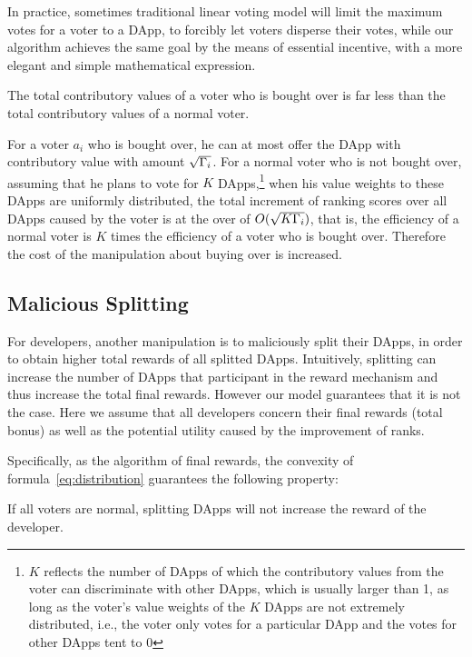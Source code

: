 In practice, sometimes traditional  linear voting model will limit the maximum votes for a voter to a DApp, to forcibly let voters disperse their votes, while our algorithm achieves the same goal by the means of essential incentive, with a more elegant and simple mathematical expression.


\begin{corollary}
	The total contributory values of a  voter who is bought over is far less than the total contributory values of a normal voter.
\end{corollary}
For a voter $a_i$ who is bought over, he can at most offer the DApp with contributory value with amount $\sqrt{\Gamma_i}$. For a normal voter who is not bought over, assuming that he plans to vote for $K$ DApps,\footnote{$K$ reflects the number of DApps of which the contributory values from the voter can discriminate with other DApps, which is usually larger than 1, as long as the voter's value weights of the $K$ DApps are not extremely distributed, i.e., the voter only votes for a particular DApp and the votes for other DApps tent to 0} when  his value weights to these DApps are uniformly distributed, the total increment of ranking scores  over all DApps caused by the voter is at the over of $O(\sqrt{K\Gamma_i})$, that is, the efficiency of a normal voter is $K$ times the efficiency of a voter who is bought over. Therefore the cost of the manipulation about buying over is increased.

\subsection{Malicious Splitting}
\label{subsec:5.2}
\noindent For developers, another manipulation is to maliciously split their DApps, in order to obtain higher total rewards of all splitted DApps. Intuitively, splitting can increase the number of DApps that participant in the reward mechanism and thus increase the total final rewards. However our model guarantees that it is not the case. Here we assume that all developers concern their final rewards (total bonus) as well as the potential utility caused by the improvement of ranks.

Specifically, as the algorithm of final rewards, the convexity of formula~\ref{eq:distribution} guarantees the following property:
\begin{property}
	\label{p2}
    If all voters are normal, splitting DApps will not increase the reward of the developer.
\end{property}

